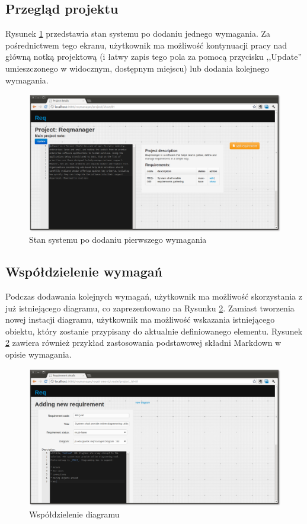     \subsection{Przegląd projektu}

      Rysunek \ref{fig:afterAddReq} przedstawia stan systemu po dodaniu jednego wymagania. Za pośrednictwem tego ekranu, użytkownik ma możliwość kontynuacji pracy nad główną notką projektową (i łatwy zapis tego pola za pomocą przycisku ,,Update'' umieszczonego w widocznym, dostępnym miejscu) lub dodania kolejnego wymagania.

      \begin{figure}[t]
        \centering
        \includegraphics[width=1.0\textwidth]{img/tut_4.png}
        \caption{Stan systemu po dodaniu pierwszego wymagania}
        \label{fig:afterAddReq}
      \end{figure}
      
    \subsection{Współdzielenie wymagań}

      Podczas dodawania kolejnych wymagań, użytkownik ma możliwość skorzystania z już istniejącego diagramu, co zaprezentowano na Rysunku \ref{fig:diagReuse}. Zamiast tworzenia nowej instacji diagramu, użytkownik ma możliwość wskazania istniejącego obiektu, który zostanie przypisany do aktualnie definiowanego elementu. Rysunek \ref{fig:diagReuse} zawiera również przykład zastosowania podstawowej składni Markdown w opisie wymagania.

      \begin{figure}[t]
        \centering
        \includegraphics[width=1.0\textwidth]{img/tut_8.png}
        \caption{Współdzielenie diagramu}
        \label{fig:diagReuse}
      \end{figure}

